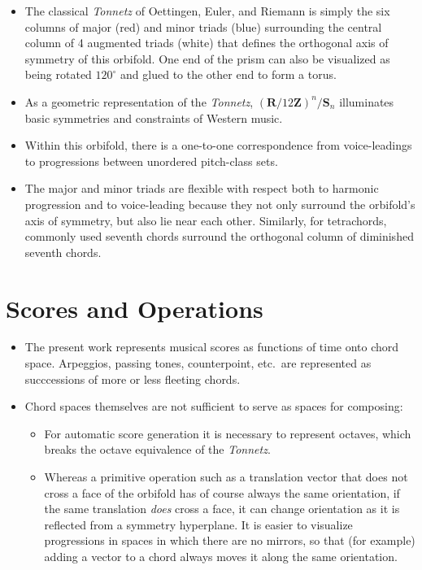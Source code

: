 \documentclass[14pt,letterpaper,onecolumn]{scrartcl}
\begin{document}
\begin{itemize}
\item The classical \emph{Tonnetz} of Oettingen, Euler, and Riemann is simply the six columns of major (red) and minor triads (blue) surrounding the central column of 4 augmented triads (white) that defines the orthogonal axis of symmetry of this orbifold. One end of the prism can also be visualized as being rotated $120 ^{\circ}$ and glued to the other end to form a torus.

\item As a geometric representation of the \emph{Tonnetz}, $\left(\textbf{R}/12\textbf{Z}\right)^{n}/\textbf{S}_{n}$ illuminates basic symmetries and constraints of Western music. 

\newpage

\item Within this orbifold, there is a one-to-one correspondence from voice-leadings to progressions between unordered pitch-class sets.

\item The major and minor triads are flexible with respect both to harmonic progression and to voice-leading because they not only surround the orbifold's axis of symmetry, but also lie near each other. Similarly, for tetrachords, commonly used seventh chords surround the orthogonal column of diminished seventh chords. 

\end{itemize}

\section{Scores and Operations}

\begin{itemize}

\item The present work represents musical scores as functions of time onto chord space. Arpeggios, passing tones, counterpoint, etc.\ are represented as succcessions of more or less fleeting chords.

\item Chord spaces themselves are not sufficient to serve as spaces for composing:

\begin{itemize}

\item For automatic score generation it is necessary to represent octaves, which breaks the octave equivalence of the \emph{Tonnetz}.

\item Whereas a primitive operation such as a translation vector that does not cross a face of the orbifold has of course always the same orientation, if the same translation \emph{does} cross a face, it can change orientation as it is reflected from a symmetry hyperplane. It is easier to visualize progressions in spaces in which there are no mirrors, so that (for example) adding a vector to a chord always moves it along the same orientation.

\end{itemize}

\end{itemize}
\end{document}

